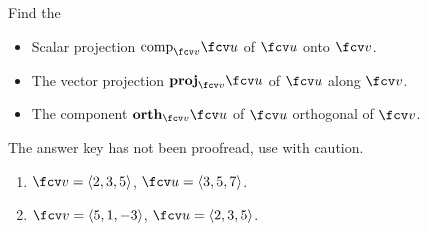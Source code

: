Find the
\begin{itemize}
\item Scalar projection $\text{comp}_{\fcv v} \fcv u$ of $\fcv u$ onto $\fcv v$.
\item The vector projection ${\bf proj}_{\fcv v}\fcv u$ of $\fcv u$ along $\fcv v$.
\item The component ${\bf orth}_{\fcv v}\fcv u$ of $\fcv u$ orthogonal of $\fcv v$.
\end{itemize}
The answer key has not been proofread, use with caution.
\begin{enumerate}
\item $\fcv v=\langle 2,3,5 \rangle$, $\fcv u=\langle 3,5,7 \rangle$.
\item $\fcv v=\langle  5,1,-3 \rangle$, $\fcv u=\langle2,3,5 \rangle$.
\end{enumerate}